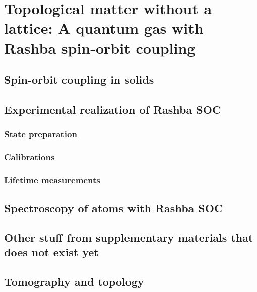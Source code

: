 
\renewcommand{\thechapter}{8}

\chapter{Topological matter without a lattice: A quantum gas with Rashba spin-orbit coupling}
\label{ch:Rashba}



\section{Spin-orbit coupling in solids}
\section{Experimental realization of Rashba SOC }
\subsection{State preparation}
\subsection{Calibrations}
\subsection{Lifetime measurements}
\section{Spectroscopy of atoms with Rashba SOC}
\section{Other stuff from supplementary materials that does not exist yet}
\section{Tomography and topology}
